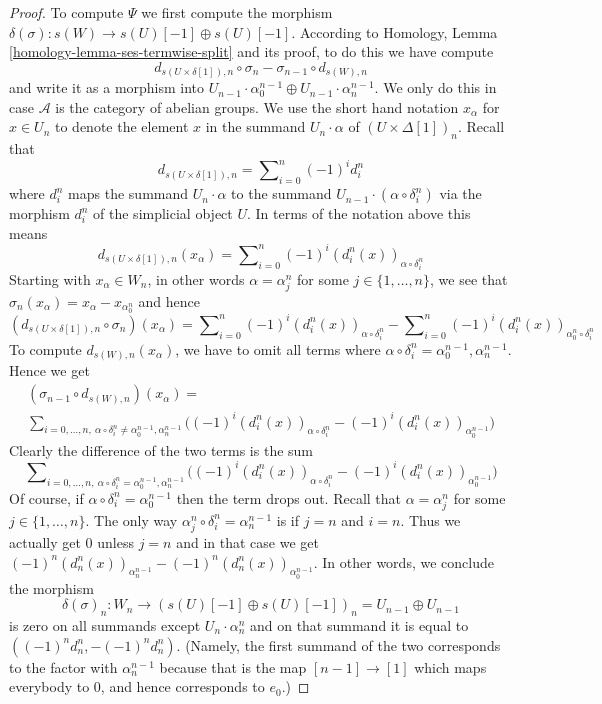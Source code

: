 \begin{proof}
\medskip\noindent
To compute $\Psi$ we first compute the morphism
$\delta(\sigma) : s(W) \to s(U)[-1] \oplus s(U)[-1]$.
According to Homology, Lemma \ref{homology-lemma-ses-termwise-split}
and its proof,
to do this we have compute
$$
d_{s(U \times \delta[1]), n} \circ \sigma_n
-
\sigma_{n - 1} \circ d_{s(W), n}
$$
and write it as a morphism into
$U_{n - 1} \cdot \alpha^{n - 1}_0 \oplus U_{n - 1} \cdot \alpha^{n - 1}_n$.
We only do this in case $\mathcal{A}$ is the category of abelian
groups. We use the short hand notation $x_{\alpha}$ for $x \in U_n$
to denote the element $x$ in the summand $U_n \cdot \alpha$
of $(U \times \Delta[1])_n$. Recall that
$$
d_{s(U\times \delta[1]), n}
=
\sum\nolimits_{i = 0}^n (-1)^i d^n_i
$$
where $d^n_i$ maps the summand $U_n \cdot \alpha$
to the summand $U_{n - 1} \cdot (\alpha \circ \delta^n_i)$
via the morphism $d^n_i$ of the simplicial object $U$.
In terms of the notation above this means
$$
d_{s(U\times \delta[1]), n}(x_\alpha) =
\sum\nolimits_{i = 0}^n (-1)^i (d^n_i(x))_{\alpha \circ \delta^n_i}
$$
Starting with $x_\alpha \in W_n$, in other words $\alpha = \alpha^n_j$
for some $j \in \{1, \ldots, n\}$, we see that
$\sigma_n(x_\alpha) = x_\alpha - x_{\alpha^n_0}$ and
hence
$$
(d_{s(U \times \delta[1]), n} \circ \sigma_n)(x_\alpha)
=
\sum\nolimits_{i = 0}^n (-1)^i (d^n_i(x))_{\alpha \circ \delta^n_i}
-
\sum\nolimits_{i = 0}^n (-1)^i (d^n_i(x))_{\alpha^n_0 \circ \delta^n_i}
$$
To compute $d_{s(W), n}(x_\alpha)$, we have to omit
all terms where $\alpha \circ \delta^n_i = \alpha^{n - 1}_0, \alpha^{n - 1}_n$.
Hence we get
$$
\begin{matrix}
(\sigma_{n - 1} \circ d_{s(W), n})(x_\alpha) = \\
\sum\nolimits_{i = 0, \ldots, n, \ 
\alpha \circ \delta^n_i \not = \alpha^{n - 1}_0, \alpha^{n - 1}_n}
\Big((-1)^i (d^n_i(x))_{\alpha \circ \delta^n_i}
-
(-1)^i (d^n_i(x))_{\alpha^{n - 1}_0}
\Big)
\end{matrix}
$$
Clearly the difference of the two terms is the sum
$$
\sum\nolimits_{i = 0, \ldots, n, \ 
\alpha \circ \delta^n_i = \alpha^{n - 1}_0, \alpha^{n - 1}_n}
\Big((-1)^i (d^n_i(x))_{\alpha \circ \delta^n_i}
-
(-1)^i (d^n_i(x))_{\alpha^{n - 1}_0}
\Big)
$$
Of course, if $\alpha \circ \delta^n_i = \alpha^{n - 1}_0$
then the term drops out. Recall that $\alpha = \alpha^n_j$
for some $j \in \{1, \ldots, n\}$. The only way
$\alpha^n_j \circ \delta^n_i = \alpha^{n - 1}_n$
is if $j = n$ and $i = n$. Thus we actually get
$0$ unless $j = n$ and in that case we get
$(-1)^n(d^n_n(x))_{\alpha^{n - 1}_n} - (-1)^n(d^n_n(x))_{\alpha^{n - 1}_0}$.
In other words, we conclude the morphism
$$
\delta(\sigma)_n :
W_n
\to
(s(U)[-1] \oplus s(U)[-1])_n = U_{n - 1} \oplus U_{n - 1}
$$
is zero on all summands except $U_n \cdot \alpha^n_n$
and on that summand it is equal to $((-1)^nd^n_n, -(-1)^nd^n_n)$.
(Namely, the first summand of the two corresponds to the factor
with $\alpha^{n - 1}_n$ because that is the map $[n - 1] \to [1]$
which maps everybody to $0$, and hence corresponds to $e_0$.)


\end{proof}
